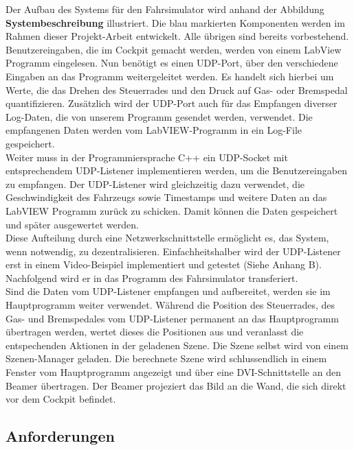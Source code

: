 Der Aufbau des Systems für den Fahrsimulator wird anhand der Abbildung \textbf{Systembeschreibung} illustriert. Die blau markierten Komponenten werden im Rahmen dieser Projekt-Arbeit entwickelt. Alle übrigen sind bereits vorbestehend. \\
Benutzereingaben, die im Cockpit gemacht werden, werden von einem LabView Programm eingelesen. Nun benötigt es einen UDP-Port,  über den verschiedene Eingaben an das Programm weitergeleitet werden. Es handelt sich hierbei um Werte, die das Drehen des Steuerrades und den Druck auf Gas- oder Bremspedal quantifizieren. Zusätzlich wird der UDP-Port auch für das Empfangen diverser Log-Daten, die von unserem Programm gesendet werden, verwendet. Die empfangenen Daten werden vom LabVIEW-Programm  in ein Log-File gespeichert.\\
Weiter muss in der Programmiersprache C++ ein UDP-Socket mit entsprechendem UDP-Listener implementieren werden, um die Benutzereingaben zu empfangen. Der UDP-Listener wird gleichzeitig dazu verwendet, die Geschwindigkeit des Fahrzeugs sowie Timestamps und weitere Daten an das LabVIEW Programm zurück zu schicken. Damit können die Daten gespeichert und später ausgewertet werden.\\
Diese Aufteilung durch eine Netzwerkschnittstelle ermöglicht es,  das System, wenn notwendig, zu dezentralisieren. Einfachheitshalber wird der UDP-Listener erst in einem Video-Beispiel implementiert und getestet (Siehe Anhang B). Nachfolgend wird er in das Programm des Fahrsimulator transferiert.\\
Sind die Daten vom UDP-Listener empfangen und aufbereitet, werden sie im Hauptprogramm weiter verwendet. Während die Position des Steuerrades, des Gas- und Bremspedales vom UDP-Listener permanent an das Hauptprogramm übertragen werden, wertet dieses die Positionen aus und veranlasst die entspechenden Aktionen in der geladenen Szene. 
Die Szene selbst wird von einem Szenen-Manager geladen. Die berechnete Szene wird schlussendlich in einem Fenster vom Hauptprogramm angezeigt und über eine DVI-Schnittstelle an den Beamer übertragen. Der Beamer projeziert das Bild an die Wand, die sich direkt vor dem Cockpit befindet. 

\subsection{Anforderungen}

